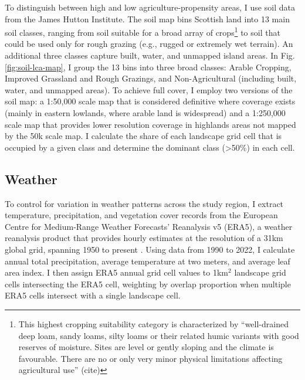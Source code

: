 To distinguish between high and low agriculture-propensity areas, I use soil data from the James Hutton Institute. The soil map bins Scottish land into 13 main soil classes, ranging from soil suitable for a broad array of crops\footnote{This highest cropping suitability category is characterized by ``well-drained deep loam, sandy loams, silty loams or their related humic variants with good reserves of moisture. Sites are level or gently sloping and the climate is favourable. There are no or only very minor physical limitations affecting agricultural use'' (cite)} to soil that could be used only for rough grazing (e.g., rugged or extremely wet terrain). An additional three classes capture built, water, and unmapped island areas. In Fig. \ref{fig:soil-lca-map}, I group the 13 bins into three broad classes: Arable Cropping, Improved Grassland and Rough Grazings, and Non-Agricultural (including built, water, and unmapped areas). To achieve full cover, I employ two versions of the soil map: a 1:50,000 scale map that is considered definitive where coverage exists (mainly in eastern lowlands, where arable land is widespread) and a 1:250,000 scale map that provides lower resolution coverage in highlands areas not mapped by the 50k scale map. I calculate the share of each landscape grid cell that is occupied by a given class and determine the dominant class (>50\%) in each cell.

\subsection{Weather}

To control for variation in weather patterns across the study region, I extract temperature, precipitation, and vegetation cover records from the European Centre for Medium-Range Weather Forecasts' Reanalysis v5 (ERA5), a weather reanalysis product that provides hourly estimates at the resolution of a 31km global grid, spanning 1950 to present \citep{hersbach_era5_2020}. Using data from 1990 to 2022, I calculate annual total precipitation, average temperature at two meters, and average leaf area index. I then assign ERA5 annual grid cell values to 1km$^2$ landscape grid cells intersecting the ERA5 cell, weighting by overlap proportion when multiple ERA5 cells intersect with a single landscape cell.

